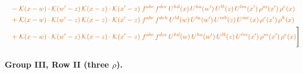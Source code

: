 \documentclass[10pt]{article}
\numberwithin{equation}{section}
\begin{document}
\begin{align}
&\quad{\color{BFK}-\;\mathcal{K}(x-w)\cdot\mathcal{K}(w'-z)\,\mathcal{K}(x-z)\cdot\mathcal{K}(x'-z)\;f^{abc}\,f^{dce}\,U^{hd}(x)\,U^{ha}(w')\,U^{lb}(z)\,U^{lm}(x')\,\rho^{m}(x')\,\rho^{e}(x)}\notag\\
&\quad{\color{BFK}+\;\mathcal{K}(x-w)\cdot\mathcal{K}(w'-z)\,\mathcal{K}(x-z)\cdot\mathcal{K}(x'-z)\;f^{abc}\,f^{deh}\,U^{ld}(w)\,U^{la}(w')\,U^{mb}(z)\,U^{me}(x)\,\rho^{c}(x')\,\rho^{h}(x)}\notag\\
&\quad{\color{BFK}+\;\mathcal{K}(x-w)\cdot\mathcal{K}(w'-z)\,\mathcal{K}(x-z)\cdot\mathcal{K}(x'-z)\;f^{abc}\,f^{dce}\,U^{hd}(w)\,U^{ha}(w')\,U^{lb}(z)\,U^{lm}(x')\,\rho^{m}(x')\,\rho^{e}(x)}\Bigg]\label{eq:P4}
\end{align}
\paragraph{Group III, Row II (three $\rho$).}
\end{document}
